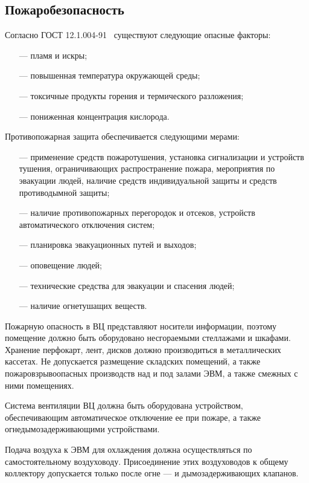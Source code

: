 \subsection{Пожаробезопасность}
\label{sec:bgd:fire}
Согласно ГОСТ 12.1.004-91~\cite{BGDGost_12_1_004_91} существуют следующие опасные факторы:
\begin{itemize}
\item[---] пламя и искры;
\item[---] повышенная температура окружающей среды;
\item[---] токсичные продукты горения и термического разложения;
\item[---] пониженная концентрация кислорода.
\end{itemize}

Противопожарная защита обеспечивается следующими мерами:
\begin{itemize}
\item[---] применение средств пожаротушения, установка сигнализации и устройств тушения, ограничивающих распространение пожара, мероприятия по эвакуации людей, наличие средств индивидуальной защиты и средств противодымной защиты;
\item[---] наличие противопожарных перегородок и отсеков, устройств автоматического отключения систем;
\item[---] планировка эвакуационных путей и выходов;
\item[---] оповещение людей;
\item[---] технические средства для эвакуации и спасения людей;
\item[---] наличие огнетушащих веществ.
\end{itemize}

Пожарную опасность в ВЦ представляют носители информации, поэтому помещение должно быть оборудовано несгораемыми стеллажами и шкафами. Хранение перфокарт, лент, дисков должно производиться в металлических кассетах. Не допускается размещение складских помещений, а также пожаровзрывоопасных производств над и под залами ЭВМ, а также смежных с ними помещениях.

Система вентиляции ВЦ должна быть оборудована устройством, обеспечивающим автоматическое отключение ее при пожаре, а также огнедымозадерживающими устройствами.

Подача воздуха к ЭВМ для охлаждения должна осуществляться по самостоятельному воздуховоду. Присоединение этих воздуховодов к общему коллектору допускается только после огне --- и дымозадерживающих клапанов.

